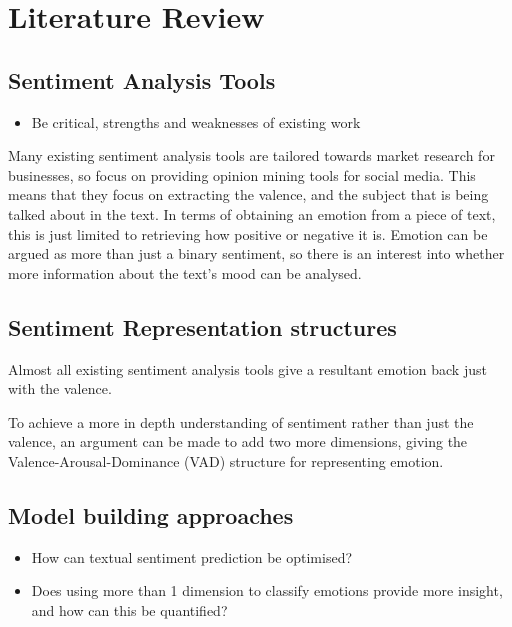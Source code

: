 
\section{Literature Review}
\subsection{Sentiment Analysis Tools}
\begin{itemize}
    \item Be critical, strengths and weaknesses of existing work
\end{itemize}

Many existing sentiment analysis tools are tailored towards market research for businesses, so focus on providing opinion mining tools for social media. This means that they focus on extracting the valence, and the subject that is being talked about in the text. In terms of obtaining an emotion from a piece of text, this is just limited to retrieving how positive or negative it is. Emotion can be argued as more than just a binary sentiment, so there is an interest into whether more information about the text's mood can be analysed. 


\subsection{Sentiment Representation structures}

Almost all existing sentiment analysis tools give a resultant emotion back just with the valence.

To achieve a more in depth understanding of sentiment rather than just the valence, an argument can be made to add two more dimensions, giving the Valence-Arousal-Dominance (VAD) structure for representing emotion.



\subsection{Model building approaches}
\begin{itemize}
    \item How can textual sentiment prediction be optimised?
    \item Does using more than 1 dimension to classify emotions provide more insight, and how can this be quantified?
\end{itemize}

